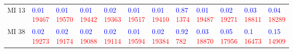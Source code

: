 \begin{tabular}{llllllllllll}
MI 13  &  \makecell{\textcolor{blue}{0.01} \\ \textcolor{red}{19467}} &  \makecell{\textcolor{blue}{0.01} \\ \textcolor{red}{19570}} &  \makecell{\textcolor{blue}{0.01} \\ \textcolor{red}{19442}} &  \makecell{\textcolor{blue}{0.02} \\ \textcolor{red}{19363}} &  \makecell{\textcolor{blue}{0.01} \\ \textcolor{red}{19517}} &  \makecell{\textcolor{blue}{0.01} \\ \textcolor{red}{19410}} &  \makecell{\textcolor{blue}{0.87} \\ \textcolor{red}{1374}} &  \makecell{\textcolor{blue}{0.01} \\ \textcolor{red}{19487}} &  \makecell{\textcolor{blue}{0.02} \\ \textcolor{red}{19271}} &  \makecell{\textcolor{blue}{0.03} \\ \textcolor{red}{18811}} &  \makecell{\textcolor{blue}{0.04} \\ \textcolor{red}{18289}} \\
MI 38  &  \makecell{\textcolor{blue}{0.02} \\ \textcolor{red}{19273}} &  \makecell{\textcolor{blue}{0.02} \\ \textcolor{red}{19174}} &  \makecell{\textcolor{blue}{0.02} \\ \textcolor{red}{19088}} &  \makecell{\textcolor{blue}{0.02} \\ \textcolor{red}{19114}} &  \makecell{\textcolor{blue}{0.01} \\ \textcolor{red}{19594}} &  \makecell{\textcolor{blue}{0.02} \\ \textcolor{red}{19384}} &   \makecell{\textcolor{blue}{0.92} \\ \textcolor{red}{782}} &  \makecell{\textcolor{blue}{0.03} \\ \textcolor{red}{18870}} &  \makecell{\textcolor{blue}{0.05} \\ \textcolor{red}{17956}} &   \makecell{\textcolor{blue}{0.1} \\ \textcolor{red}{16473}} &  \makecell{\textcolor{blue}{0.15} \\ \textcolor{red}{14909}} \\

\end{tabular}
